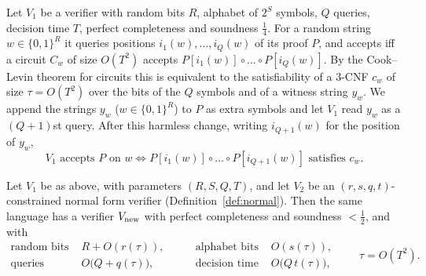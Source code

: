 Let $V_1$ be a verifier with random bits $R$, alphabet of $2^{S}$ symbols, $Q$ queries, decision time $T$, perfect completeness and soundness $\tfrac14$.  For a random string $w\in\{0,1\}^R$ it queries positions
$i_1(w),\dots,i_Q(w)$ of its proof $P$, and accepts iff a circuit $C_w$ of size $O(T^2)$ accepts $P[i_1(w)]\circ\dots\circ P[i_Q(w)]$.  By the Cook--Levin theorem for circuits this is equivalent to the satisfiability of a $3$-CNF
$c_w$ of size $\tau=O(T^2)$ over the bits of the $Q$ symbols and of a witness string $y_w$.  We append the strings $y_w$ ($w\in\{0,1\}^R$) to $P$ as extra symbols and let $V_1$ read $y_w$ as a $(Q{+}1)$st query.
After this harmless change, writing $i_{Q+1}(w)$ for the position of $y_w$,
\begin{equation}\label{eq:decide}
  V_1\text{ accepts }P\text{ on }w\iff P[i_1(w)]\circ\dots\circ P[i_{Q+1}(w)]\text{ satisfies }c_w .
\end{equation}

\begin{lemma}\label{lem:compose}
Let $V_1$ be as above, with parameters $(R,S,Q,T)$, and let $V_2$ be an $(r,s,q,t)$-constrained normal form verifier (Definition~\ref{def:normal}).
Then the same language has a verifier $V_{\rm new}$ with perfect completeness and soundness $<\tfrac12$, and with
\[
  \begin{aligned}
  \text{random bits } &R+O(r(\tau)),\qquad &\text{alphabet bits } &O(s(\tau)),\\
  \text{queries } &O\bigl(Q+q(\tau)\bigr),\qquad &\text{decision time } &O\bigl(Q\,t(\tau)\bigr),
  \end{aligned}\qquad\tau=O(T^2).
\]
\end{lemma}

